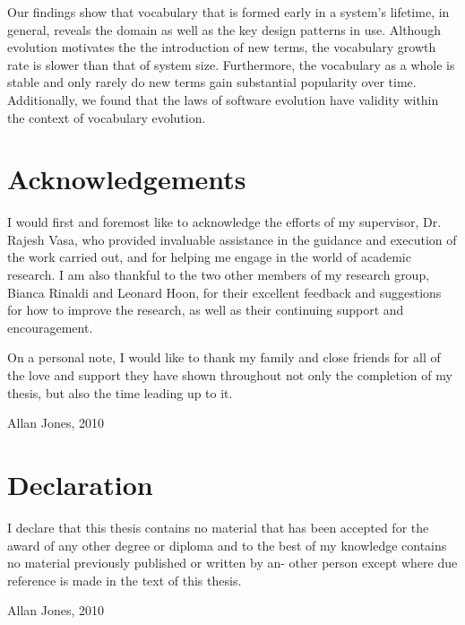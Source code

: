 Our findings show that vocabulary that is formed early in a system's lifetime, in general, reveals the domain as well as the key design patterns in use. Although evolution motivates the the introduction of new terms, the vocabulary growth rate is slower than that of system size. Furthermore, the vocabulary as a whole is stable and only rarely do new terms gain substantial popularity over time. Additionally, we found that the laws of software evolution have validity within the context of vocabulary evolution.

\chapter*{Acknowledgements}
\vspace{-0.5cm}

I would first and foremost like to acknowledge the efforts of my supervisor, Dr. Rajesh Vasa, who provided invaluable assistance in the guidance and execution of the work carried out, and for helping me engage in the world of academic research. I am also thankful to the two other members of my research group, Bianca Rinaldi and Leonard Hoon, for their excellent feedback and suggestions for how to improve the research, as well as their continuing support and encouragement.

On a personal note, I would like to thank my family and close friends for all of the love and support they have shown throughout not only the completion of my thesis, but also the time leading up to it.

\vspace*{4cm} Allan Jones, 2010

\chapter*{Declaration}
\vspace{-0.5cm}

I declare that this thesis contains no material that has been accepted for the award of any other degree or diploma and to the best of my knowledge contains no material previously published or written by an- other person except where due reference is made in the text of this thesis.

\vspace*{4cm} Allan Jones, 2010

\singlespacing

\tableofcontents \listoffigures \listoftables 
\newpage
